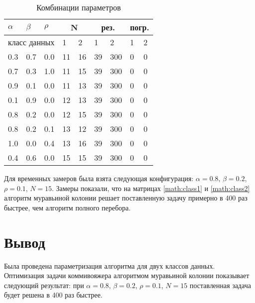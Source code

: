 \begin{table}[H]
	\centering
	\renewcommand{\arraystretch}{1.2}
	\caption{Комбинации параметров}
	\begin{tabular}{||p{}p{}p{}p{}p{}p{}p{}p{}p{}||}
		\hline
		$\alpha$ & $\beta$ & $\rho$ & \multicolumn{2}{c}{N} & \multicolumn{2}{c}{рез.} & \multicolumn{2}{c||}{погр.} \\
		\hline
		\multicolumn{3}{||c}{класс данных} & 1 & 2 & 1 & 2 & 1 & 2 \\ \hline\hline
		0.3 & 0.7 & 0.0 & 11 & 16 & 39 & 300 & 0 & 0 \\ 
		0.7 & 0.3 & 1.0 & 11 & 15 & 39 & 300 & 0 & 0 \\ 
		0.9 & 0.1 & 0.0 & 11 & 13 & 39 & 300 & 0 & 0 \\ 
		0.1 & 0.9 & 0.0 & 12 & 13 & 39 & 300 & 0 & 0 \\ 
		0.8 & 0.2 & 0.0 & 12 & 15 & 39 & 300 & 0 & 0 \\ 
		0.8 & 0.2 & 0.1 & 13 & 12 & 39 & 300 & 0 & 0 \\ 
		1.0 & 0.0 & 0.4 & 13 & 16 & 39 & 300 & 0 & 0 \\ 
		0.4 & 0.6 & 0.0 & 15 & 15 & 39 & 300 & 0 & 0 \\ 
		\hline
	\end{tabular}
		
	\label{tab:classes-res}
\end{table}

Для временных замеров была взята следующая конфигурация: $\alpha = 0.8$, $\beta = 0.2$, $\rho = 0.1$, $N = 15$. Замеры показали, что на матрицах \ref{math:class1} и \ref{math:class2} алгоритм муравьиной колонии решает поставленную задачу примерно в 400 раз быстрее, чем алгоритм полного перебора.

\section{Вывод}\label{sec:exp-sum}
Была проведена параметризация алгоритма для двух классов данных. Оптимизация задачи коммивояжера алгоритмом муравьиной колонии показывает следующий результат: при $\alpha = 0.8$, $\beta = 0.2$, $\rho = 0.1$, $N = 15$ поставленная задача будет решена в 400 раз быстрее. 